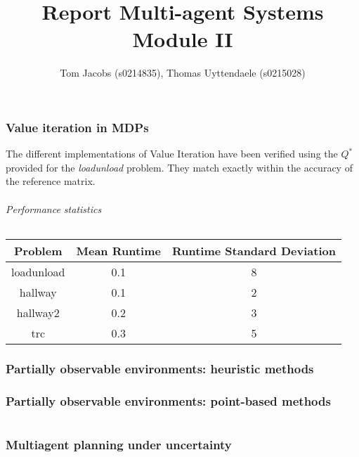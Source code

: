 \documentclass[10pt,a4paper]{article}
\title{Report Multi-agent Systems Module II}
\author{Tom Jacobs (s0214835), Thomas Uyttendaele (s0215028)}
\begin{document}
\maketitle
\part{}
\section{Value iteration in MDPs}
The different implementations of Value Iteration have been verified using the $Q^{*}$ provided for the \emph{loadunload} problem. They match exactly within the accuracy of the reference matrix.
\paragraph{Performance statistics}\hfill
\begin{table}[!h]
\centering
\begin{tabular}{ c | c | c }
Problem & Mean Runtime & Runtime Standard Deviation \\
\hline
loadunload & 0.1 & 8 \\
hallway & 0.1 & 2 \\
hallway2 & 0.2 & 3 \\
trc & 0.3 & 5 \\
\end{tabular}
\end{table}

\section{Partially observable environments: heuristic methods}

\section{Partially observable environments: point-based methods}

\part{}
\section{Multiagent planning under uncertainty}
\end{document}
